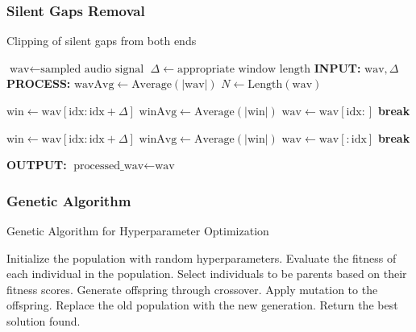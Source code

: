 \subsubsection{Silent Gaps Removal}
\label{alg:Silence_Removal}
\begin{algorithm}
    \caption{Clipping of silent gaps from both ends}
    \begin{algorithmic}[1]
    \STATE $ \text{wav} \gets \text{sampled audio signal} $
    \STATE $ \Delta \gets \text{appropriate window length} $
    \STATE {}
    \STATE \textbf{INPUT:} $ \text{wav}, \Delta $
    \STATE \textbf{PROCESS:}
    \STATE $ \text{wavAvg} \gets \text{Average}(|\text{wav}|) $
    \STATE $ N \gets \text{Length}(\text{wav}) $
    
    \STATE {}
        \STATE $ \text{win} \gets \text{wav}[\text{idx} : \text{idx} + \Delta] $
        \STATE $ \text{winAvg} \gets \text{Average}(|\text{win}|) $
            \STATE $ \text{wav} \gets \text{wav}[\text{idx} :] $
            \STATE \textbf{break}
        \ENDIF
    \ENDFOR
    
    \STATE {}
        \STATE $ \text{win} \gets \text{wav}[\text{idx} : \text{idx} + \Delta] $
        \STATE $ \text{winAvg} \gets \text{Average}(|\text{win}|) $
            \STATE $ \text{wav} \gets \text{wav}[: \text{idx}] $
            \STATE \textbf{break}
        \ENDIF
    \ENDFOR
    
    \STATE \textbf{OUTPUT:} $ \text{processed\_wav} \gets \text{wav} $
    \end{algorithmic}
    \end{algorithm}


\subsubsection{Genetic Algorithm}
\begin{algorithm}[H]
\caption{Genetic Algorithm for Hyperparameter Optimization}
\begin{algorithmic}[1]
\STATE Initialize the population with random hyperparameters.
    \STATE Evaluate the fitness of each individual in the population.
    \STATE Select individuals to be parents based on their fitness scores.
    \STATE Generate offspring through crossover.
    \STATE Apply mutation to the offspring.
    \STATE Replace the old population with the new generation.
\ENDFOR
\STATE Return the best solution found.
\end{algorithmic}
\end{algorithm}

